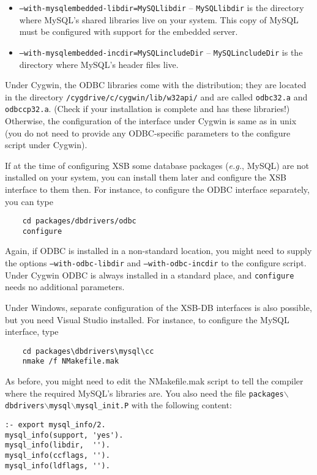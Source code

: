 \begin{itemize}%
\item {\tt --with-mysqlembedded-libdir=MySQLlibdir} -- {\tt MySQLlibdir} is the
  directory where MySQL's shared libraries live on your system.
  This copy of MySQL must be configured with support for the embedded
  server.
\item {\tt --with-mysqlembedded-incdir=MySQLincludeDir} -- {\tt MySQLincludeDir} is
  the directory where MySQL's header files live.  
\end{itemize}

Under Cygwin, the ODBC libraries come with the distribution; they are
located in the directory {\tt /cygdrive/c/cygwin/lib/w32api/} and are called
{\tt odbc32.a} and {\tt odbccp32.a}. (Check if your installation is complete
and has these libraries!)
Otherwise, the configuration of the interface under Cygwin is
same as in unix (you do not need to provide any ODBC-specific parameters to
the configure script under Cygwin).


If at the time of configuring XSB some database packages ({\it e.g.},
MySQL) are not installed on your system, you can install them later and
configure the XSB interface to them then. For instance, to configure the
ODBC interface separately, you can type
\begin{verbatim}
    cd packages/dbdrivers/odbc
    configure
\end{verbatim}
Again, if ODBC is installed in a non-standard location, you might need to
supply the options {\tt --with-odbc-libdir} and {\tt --with-odbc-incdir} to
the configure script. Under Cygwin ODBC is always installed in a
standard place, and {\tt configure} needs no additional parameters.

Under Windows, separate configuration of the XSB-DB interfaces is also
possible, but you need Visual Studio installed. For instance, to configure
the MySQL interface, type
\begin{verbatim}
    cd packages\dbdrivers\mysql\cc  
    nmake /f NMakefile.mak
\end{verbatim}
As before, you might need to edit the NMakefile.mak script to tell the
compiler where the required MySQL's libraries are. You also need the file
{\tt packages$\backslash$dbdrivers$\backslash$mysql$\backslash$mysql\_init.P} with the following content:
\begin{verbatim}
:- export mysql_info/2.
mysql_info(support, 'yes').
mysql_info(libdir,  '').
mysql_info(ccflags, '').
mysql_info(ldflags, '').
\end{verbatim}

